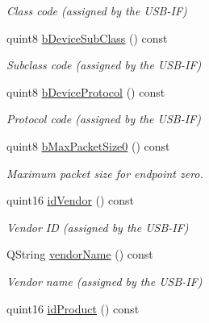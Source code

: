\begin{DoxyCompactItemize}
\begin{DoxyCompactList}\small\item\em Class code (assigned by the USB-\/IF) \end{DoxyCompactList}\item 
\hypertarget{classmdt_usb_device_descriptor_a50b483ed26f546017bde4ae6f9762268}{
quint8 \hyperlink{classmdt_usb_device_descriptor_a50b483ed26f546017bde4ae6f9762268}{bDeviceSubClass} () const }
\label{classmdt_usb_device_descriptor_a50b483ed26f546017bde4ae6f9762268}

\begin{DoxyCompactList}\small\item\em Subclass code (assigned by the USB-\/IF) \end{DoxyCompactList}\item 
\hypertarget{classmdt_usb_device_descriptor_aac1207bd8cb91e04f48f6748b1a8ca16}{
quint8 \hyperlink{classmdt_usb_device_descriptor_aac1207bd8cb91e04f48f6748b1a8ca16}{bDeviceProtocol} () const }
\label{classmdt_usb_device_descriptor_aac1207bd8cb91e04f48f6748b1a8ca16}

\begin{DoxyCompactList}\small\item\em Protocol code (assigned by the USB-\/IF) \end{DoxyCompactList}\item 
quint8 \hyperlink{classmdt_usb_device_descriptor_a08b5ae262e2b966c952ee5e5bcc6fb10}{bMaxPacketSize0} () const 
\begin{DoxyCompactList}\small\item\em Maximum packet size for endpoint zero. \end{DoxyCompactList}\item 
\hypertarget{classmdt_usb_device_descriptor_a8bbfdb3c54af6cccf15cd7e5f29e8a8e}{
quint16 \hyperlink{classmdt_usb_device_descriptor_a8bbfdb3c54af6cccf15cd7e5f29e8a8e}{idVendor} () const }
\label{classmdt_usb_device_descriptor_a8bbfdb3c54af6cccf15cd7e5f29e8a8e}

\begin{DoxyCompactList}\small\item\em Vendor ID (assigned by the USB-\/IF) \end{DoxyCompactList}\item 
QString \hyperlink{classmdt_usb_device_descriptor_ac2f746ebd5540b65bf00f82c991f5c3b}{vendorName} () const 
\begin{DoxyCompactList}\small\item\em Vendor name (assigned by the USB-\/IF) \end{DoxyCompactList}\item 
\hypertarget{classmdt_usb_device_descriptor_a722dad54d42f03470508115f6394b9a1}{
quint16 \hyperlink{classmdt_usb_device_descriptor_a722dad54d42f03470508115f6394b9a1}{idProduct} () const }
\label{classmdt_usb_device_descriptor_a722dad54d42f03470508115f6394b9a1}


\end{DoxyCompactItemize}
